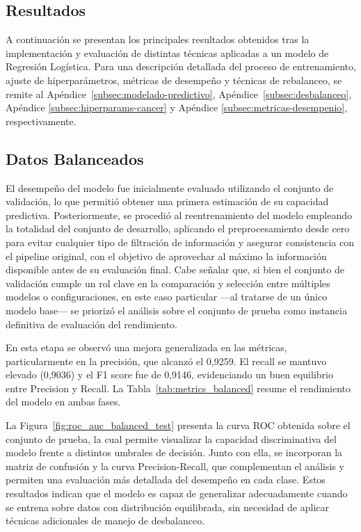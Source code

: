 \begin{multicols}{2}
\section{Resultados}
A continuación se presentan los principales resultados obtenidos tras la implementación y evaluación de distintas técnicas aplicadas a un modelo de Regresión Logística. Para una descripción detallada del proceso de entrenamiento, ajuste de hiperparámetros, métricas de desempeño  y técnicas de rebalanceo, se remite al Apéndice~\ref{subsec:modelado-predictivo},  Apéndice~\ref{subsec:desbalanceo}, Apéndice \ref{subsec:hiperparams-cancer} y Apéndice \ref{subsec:metricas-desempenio}, respectivamente.



\subsection{Datos Balanceados}

El desempeño del modelo fue inicialmente evaluado utilizando el conjunto de validación, lo que permitió obtener una primera estimación de su capacidad predictiva. Posteriormente, se procedió al reentrenamiento del modelo empleando la totalidad del conjunto de desarrollo, aplicando el preprocesamiento desde cero para evitar cualquier tipo de filtración de información y asegurar consistencia con el pipeline original, con el objetivo de aprovechar al máximo la información disponible antes de su evaluación final. Cabe señalar que, si bien el conjunto de validación cumple un rol clave en la comparación y selección entre múltiples modelos o configuraciones, en este caso particular —al tratarse de un único modelo base— se priorizó el análisis sobre el conjunto de prueba como instancia definitiva de evaluación del rendimiento.


En esta etapa se observó una mejora generalizada en las métricas, particularmente en la precisión, que alcanzó el 0,9259. El recall se mantuvo elevado (0{,}9036) y el F1 score fue de 0{,}9146, evidenciando un buen equilibrio entre Precision y Recall. La Tabla~\ref{tab:metrics_balanced} resume el rendimiento del modelo en ambas fases.

La Figura~\ref{fig:roc_auc_balanced_test} presenta la curva ROC obtenida sobre el conjunto de prueba, la cual permite visualizar la capacidad discriminativa del modelo frente a distintos umbrales de decisión. Junto con ella, se incorporan la matriz de confusión y la curva Precision-Recall, que complementan el análisis y permiten una evaluación más detallada del desempeño en cada clase. Estos resultados indican que el modelo es capaz de generalizar adecuadamente cuando se entrena sobre datos con distribución equilibrada, sin necesidad de aplicar técnicas adicionales de manejo de desbalanceo.


\end{multicols}

